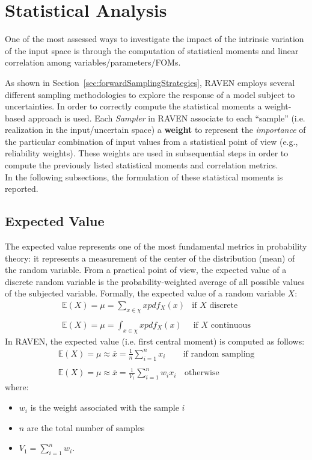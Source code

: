 \section{Statistical Analysis}
\label{sec:statisticalAnalysis}
One of the most assessed ways to investigate the impact of the intrinsic variation of the input space is through the computation of
statistical moments and linear correlation among variables/parameters/FOMs.

As shown in Section~\ref{sec:forwardSamplingStrategies}, RAVEN employs several different sampling methodologies to explore the response of a model subject to uncertainties. In order to correctly compute the statistical moments a weight-based approach is used. Each \textit{Sampler} in RAVEN associate to each ``sample'' (i.e.
realization in the input/uncertain space) a \textbf{weight}  to represent the \textit{importance} of the particular
combination of input values from a statistical point of view (e.g., reliability weights). These weights are used in subsequential
steps in order to compute the previously listed statistical moments and correlation metrics.
\\In the following subsections, the formulation of these statistical moments is reported.
\subsection{Expected Value}
The expected value represents one of the most fundamental metrics in probability theory: it represents a measurement of the center of the distribution (mean) of the random variable.
From a practical point of view, the expected value of a discrete random variable is the probability-weighted average of all possible values of the subjected variable. Formally, the expected value of a random variable $X$:
\begin{equation}
\begin{matrix}
\mathbb{E}(X) = \mu = \sum_{x \in \chi} x  pdf_{X}(x) & \text{if  $X$  discrete} \\
\\
\mathbb{E}(X) = \mu = \int_{x \in \chi} x pdf_{X}(x) & \, \text{if $X$ continuous}
\end{matrix}
\end{equation}
In RAVEN, the expected value (i.e. first central moment) is computed as follows:
\begin{equation}
\begin{matrix}
\mathbb{E}(X) = \mu \approx \overline{x} = \frac{1}{n} \sum_{i=1}^{n}  x_{i} & \text{if  random sampling} \\
\\
\mathbb{E}(X) = \mu \approx \overline{x} = \frac{1}{V_{1}} \sum_{i=1}^{n} w_{i}  x_{i}  & \, \text{otherwise}
\end{matrix}
\end{equation}
where:
\begin{itemize}
  \item $w_{i}$ is the weight associated with the sample $i$
  \item $n$ are the total number of samples
  \item $V_{1} = \sum_{i=1}^{n} w_{i}$.
\end{itemize}
